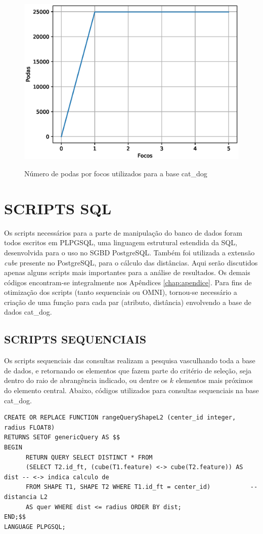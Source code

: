 \begin{figure}[H]
\centering
\caption{Número de podas por focos utilizados para a base cat\_dog}
\includegraphics[width=.6\textwidth]{dados/figuras/fococatdog.eps}
\label{fig:fococatdog}
\end{figure}

\section{SCRIPTS SQL}
Os scripts necessários para a parte de manipulação do banco de dados foram todos escritos em PLPGSQL, uma linguagem estrutural estendida da SQL, desenvolvida para o uso
no SGBD PostgreSQL. Também foi utilizada a extensão \textit{cube} presente no PostgreSQL, para o cálculo das distâncias. Aqui serão discutidos apenas alguns scripts mais importantes para a análise de resultados. Os demais códigos encontram-se integralmente
nos Apêndices \ref{chap:apendice}. Para fins de otimização dos scripts (tanto sequenciais ou OMNI), tornou-se necessário
a criação de uma função para cada par (atributo, distância) envolvendo a base de dados cat\_dog.

\subsection{SCRIPTS SEQUENCIAIS}
Os scripts sequenciais das consultas realizam a pesquisa vasculhando toda a base de dados, e retornando os elementos que fazem
parte do critério de seleção, seja dentro do raio de abrangência indicado, ou dentre os $k$ elementos mais próximos do elemento central.
Abaixo, códigos utilizados para consultas sequenciais na base cat\_dog.

\begin{lstlisting}[caption={Consulta por abrangência sequêncial utilizando forma e distância euclidiana\\}, captionpos=t,basicstyle=\tiny] 
CREATE OR REPLACE FUNCTION rangeQueryShapeL2 (center_id integer, radius FLOAT8) 
RETURNS SETOF genericQuery AS $$
BEGIN
	  RETURN QUERY SELECT DISTINCT * FROM 
	  (SELECT T2.id_ft, (cube(T1.feature) <-> cube(T2.feature)) AS dist -- <-> indica calculo de
	  FROM SHAPE T1, SHAPE T2 WHERE T1.id_ft = center_id) 		    -- distancia L2
	  AS quer WHERE dist <= radius ORDER BY dist;	
END;$$
LANGUAGE PLPGSQL;
\end{lstlisting}


